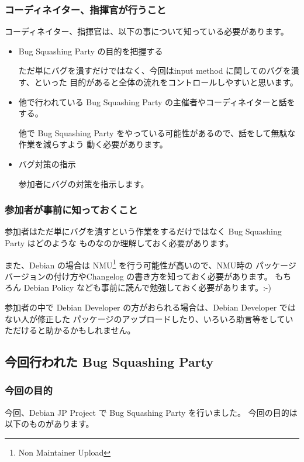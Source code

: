 \documentclass[mingoth,a4paper]{jsarticle}
\begin{document}
\subsubsection{コーディネイター、指揮官が行うこと}
コーディネイター、指揮官は、以下の事について知っている必要があります。
\begin{itemize}
	\item Bug Squashing Party の目的を把握する
		
		ただ単にバグを潰すだけではなく、今回はinput method に関してのバグを潰す、といった
		目的があると全体の流れをコントロールしやすいと思います。

	\item 他で行われている Bug Squashing Party の主催者やコーディネイターと話をする。

		他で Bug Squashing Party をやっている可能性があるので、話をして無駄な作業を減らすよう
		動く必要があります。

	\item バグ対策の指示

		参加者にバグの対策を指示します。
		
\end{itemize}

\subsubsection{参加者が事前に知っておくこと}

参加者はただ単にバグを潰すという作業をするだけではなく Bug Squashing Party はどのような
ものなのか理解しておく必要があります。

また、Debian の場合は NMU\footnote{Non Maintainer Upload} を行う可能性が高いので、NMU時の
パッケージバージョンの付け方やChangelog の書き方を知っておく必要があります。
もちろん Debian Policy なども事前に読んで勉強しておく必要があります。:-)


参加者の中で Debian Developer の方がおられる場合は、Debian Developer ではない人が修正した
パッケージのアップロードしたり、いろいろ助言等をしていただけると助かるかもしれません。

\subsection{今回行われた Bug Squashing Party }

\subsubsection{今回の目的}
今回、Debian JP Project で Bug Squashing Party を行いました。
今回の目的は以下のものがあります。
\end{document}
